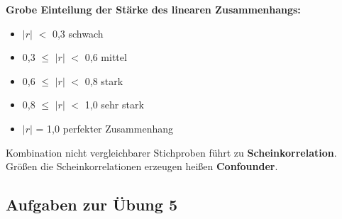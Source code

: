 \textbf{Grobe Einteilung der Stärke des linearen Zusammenhangs:}
\begin{itemize}
	\item $|r|$ $<$ 0,3 schwach
	\item 0,3 $\leq$ $|r|$ $<$ 0,6 mittel
	\item 0,6 $\leq$ $|r|$ $<$ 0,8 stark
	\item 0,8 $\leq$ $|r|$ $<$ 1,0 sehr stark
	\item $|r|$ = 1,0 perfekter Zusammenhang
\end{itemize}

Kombination nicht vergleichbarer Stichproben führt zu \textbf{Scheinkorrelation}. Größen die Scheinkorrelationen erzeugen heißen \textbf{Confounder}.

\subsection{Aufgaben zur Übung 5}
